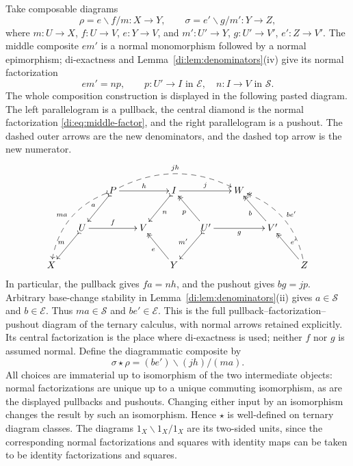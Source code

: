 \documentclass[11pt,reqno,a4paper]{amsart}
\theoremstyle{definition}
\theoremstyle{remark}
\newcommand{\0}{\mathbf{0}}
\renewcommand{\1}{\mathbf{1}}
\newcommand{\Sden}{\mathcal S}
\newcommand{\Eden}{\mathcal E}
\begin{document}
Take composable diagrams
\[
 \rho=e\backslash f/m:X\longrightarrow Y,
 \qquad \sigma=e'\backslash g/m':Y\longrightarrow Z,
\]
where $m:U\to X$, $f:U\to V$, $e:Y\to V$, and
$m':U'\to Y$, $g:U'\to V'$, $e':Z\to V'$.
The middle composite $em'$ is a normal monomorphism followed by
a normal epimorphism; di-exactness and
Lemma~\ref{di:lem:denominators}(iv) give its normal factorization
\begin{equation}\label{di:eq:middle-factor}
 em'=np,\qquad p:U'\to I\text{ in }\Eden,
 \quad n:I\to V\text{ in }\Sden.
\end{equation}
The whole composition construction is displayed in the following
pasted diagram. The left parallelogram is a pullback, the central
diamond is the normal factorization \eqref{di:eq:middle-factor},
and the right parallelogram is a pushout. The dashed outer arrows
are the new denominators, and the dashed top arrow is the new
numerator.
\begin{equation}\label{di:eq:large-composition}
\vcenter{\xymatrix@C=18pt@R=26pt{
 && P\ar@{>->}[dl]_-{a}\ar[rr]^-{h}
      \ar@/^18pt/@{-->}[rrrr]^-{jh}
      \ar@/_16pt/@{>-->}[ddll]_-{ma}
 && I\ar@{>->}[dl]^-{n}\ar[rr]^-{j}
 && W && \\
 & U\ar@{>->}[dl]_-{m}\ar[rr]^-{f}
 && V && U'\ar@{>->}[ld]_-{m'}\ar@{->>}[ul]^-{p}\ar[rr]_-{g}
 && V'\ar@{->>}[ul]^-{b} & \\
 X &&&& Y\ar@{->>}[ul]^-{e}
 &&&& Z\ar@{->>}[ul]_-{e'}\ar@/_16pt/@{-->>}[uull]_-{be'}
}}
\end{equation}
In particular, the pullback gives $fa=nh$, and the pushout gives
$bg=jp$. Arbitrary base-change stability in
Lemma~\ref{di:lem:denominators}(ii) gives $a\in\Sden$ and
$b\in\Eden$. Thus $ma\in\Sden$ and $be'\in\Eden$.
This is the full pullback--factorization--pushout diagram of the
ternary calculus, with normal arrows retained explicitly. Its
central factorization is the place where di-exactness is used;
neither $f$ nor $g$ is assumed normal. Define the diagrammatic
composite by
\begin{equation}\label{di:eq:diagram-composition}
 \sigma\star\rho=(be')\backslash(jh)/(ma).
\end{equation}
All choices are immaterial up to isomorphism of the two intermediate
objects: normal factorizations are unique up to a unique commuting
isomorphism, as are the displayed pullbacks and pushouts.
Changing either input by an isomorphism changes the result by such
an isomorphism. Hence $\star$ is well-defined on ternary diagram
classes. The diagrams $1_X\backslash1_X/1_X$ are its two-sided
units, since the corresponding normal factorizations and squares
with identity maps can be taken to be identity factorizations and
squares.
\end{document}
